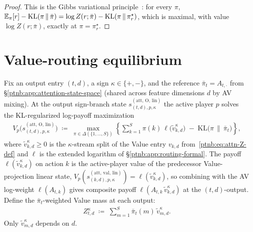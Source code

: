 \begin{proof}
This is the Gibbs variational principle~\parencite{BoydVandenberghe2004}: for every $\pi$, $\mathbb{E}_\pi[r] -
    \mathrm{KL}(\pi\,\|\,\bar\pi) = \log Z(r;\bar\pi) - \mathrm{KL}(\pi\,\|\,\pi_r^\star)$, which is
maximal, with value $\log Z(r;\bar\pi)$, exactly at $\pi = \pi_r^\star$.
\end{proof}

\section{Value-routing equilibrium}\label{ptnb:app:attention-value-routing}

Fix an output entry $(t, d)$, a sign $\kappa \in \{+,-\}$, and the reference $\bar\pi_t =
    A_{t,\cdot}$ from \S\ref{ptnb:app:attention-state-space} (shared across feature dimensions $d$ by AV mixing). At the output sign-branch state
$s_{(t,d),p,\kappa}^{(\mathrm{att},\,\mathrm{O},\,\mathrm{lin})}$ the active player $p$ solves the
KL-regularized log-payoff maximization
\begin{align}\label{ptnb:eq:attn-value-routing}
    V_p\!\bigl(s_{(t,d),p,\kappa}^{(\mathrm{att},\,\mathrm{O},\,\mathrm{lin})}\bigr)
    \;\coloneqq\;
    \max_{\pi \in \Delta(\{1,\dots,S\})}
    \left\{
    \sum_{k=1}^S \pi(k)\, \ell\!\bigl(\tilde{v}_{k,d}^\kappa\bigr)
    \;-\;
    \mathrm{KL}\!\bigl(\pi \,\|\, \bar\pi_t\bigr)
    \right\},
\end{align}
where $\tilde{v}_{k,d}^\kappa \ge 0$ is the $\kappa$-stream split of the Value entry $v_{k,d}$
from~\eqref{ptnb:eq:attn-Z-def} and $\ell$ is the extended logarithm of \S\ref{ptnb:app:routing-formal}. The
payoff $\ell(\tilde{v}_{k,d}^\kappa)$ on action $k$ is the active-player value of the predecessor
Value-projection linear state,
$V_p(s_{(k,d),p,\kappa}^{(\mathrm{att},\,\mathrm{val},\,\mathrm{lin})}) =
    \ell(\tilde{v}_{k,d}^\kappa)$, so combining with the AV log-weight $\ell(A_{t,k})$ gives composite
payoff $\ell(A_{t,k}\, \tilde{v}_{k,d}^\kappa)$ at the $(t,d)$-output. Define the $\bar\pi_t$-weighted Value mass at each output:
\begin{align}\label{ptnb:eq:attn-z-def}
    Z_{t,d}^\kappa \;\coloneqq\; \sum_{m=1}^S \bar\pi_t(m)\, \tilde{v}_{m,d}^\kappa.
\end{align}
Only $\tilde{v}_{m,d}^\kappa$ depends on $d$.

